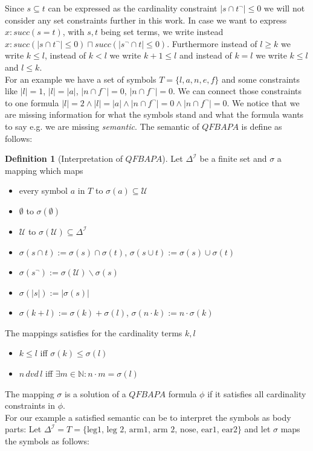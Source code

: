 \documentclass{book}
\theoremstyle{break}
\theoremstyle{definition}
\newtheorem{mydef}{Definition}
\begin{document}
Since $s\subseteq t$ can be expressed as the cardinality constraint $|s\cap t^\neg|\leq 0$ we will not consider any set constraints further in this work. In case we want to express $x:succ(s=t)$, with $s,t$ being set terms, we write instead $x:succ(|s\cap t^\neg|\leq 0)\sqcap succ(|s^\neg\cap t|\leq 0)$. Furthermore instead of $l\geq k$ we write $k\leq l$, instead of $k<l$ we write $k+1\leq l$ and instead of $k=l$ we write $k\leq l$ and $l\leq k$.\\
For an example we have a set of symbols $T=\{l, a, n, e, f\}$ and some constraints like $|l|=1$, $|l|=|a|$, $|n\cap f^\neg|=0$, $|n\cap f^\neg|=0$. We can connect those constraints to one formula $|l|=2\wedge|l|=|a|\wedge |n\cap f^\neg|=0\wedge |n\cap f^\neg|=0$. We notice that we are missing information for what the symbols stand and what the formula wants to say e.g. we are missing \textit{semantic}. The semantic of $QFBAPA$ is define as follows:
\begin{mydef}[Interpretation of $QFBAPA$]
Let $\Delta^\mathcal{I}$ be a finite set and $\sigma$ a mapping which maps
\begin{itemize}
\item every symbol $a$ in $T$ to $\sigma(a)\subseteq\mathcal{U}$
\item $\emptyset$ to $\sigma(\emptyset)$
\item $\mathcal{U}$ to $\sigma(\mathcal{U})\subseteq \Delta^\mathcal{I}$
\item $\sigma(s\cap t):= \sigma(s)\cap \sigma(t)$, $\sigma(s\cup t):= \sigma(s)\cup \sigma(t)$
\item $\sigma(s^\neg):=\sigma(\mathcal{U})\backslash \sigma(s)$
\item $\sigma(|s|):=|\sigma(s)|$
\item $\sigma(k+l):=\sigma(k)+\sigma(l)$, $\sigma(n\cdot k):= n\cdot \sigma(k)$
\end{itemize}
The mappings satisfies for the cardinality terms $k,l$
\begin{itemize}
\item $k\leq l$ iff $\sigma(k)\leq \sigma(l)$
\item $n\,dvd\,l$ iff $\exists m\in\mathbb{N}:n\cdot m = \sigma(l)$
\end{itemize}
\end{mydef}
The mapping $\sigma$ is a solution of a $QFBAPA$ formula $\phi$ if it satisfies all cardinality constraints in $\phi$.\\
For our example a satisfied semantic can be to interpret the symbols as body parts: Let $\Delta^\mathcal{I}=T=\{\text{leg1, leg 2, arm1, arm 2, nose, ear1, ear2}\}$ and let $\sigma$ maps the symbols as follows:
\end{document}
